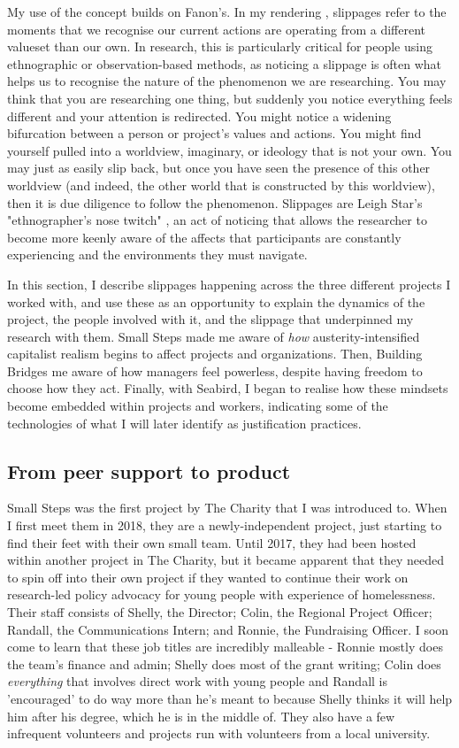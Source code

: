 My use of the concept builds on Fanon's. In my rendering \citep{cutting_making_2021}, slippages refer to the moments that we recognise our current actions are operating from a different valueset than our own. In research, this is particularly critical for people using ethnographic or observation-based methods, as noticing a slippage is often what helps us to recognise the nature of the phenomenon we are researching. You may think that you are researching one thing, but suddenly you notice everything feels different and your attention is redirected. You might notice a widening bifurcation between a person or project's values and actions. You might find yourself pulled into a worldview, imaginary, or ideology that is not your own. You may just as easily slip back, but once you have seen the presence of this other worldview (and indeed, the other world that is constructed by this worldview), then it is due diligence to follow the phenomenon. Slippages are Leigh Star's "ethnographer's nose twitch" \citep{leigh_star_this_2010}, an act of noticing that allows the researcher to become more keenly aware of the affects that participants are constantly experiencing and the environments they must navigate. 

In this section, I describe slippages happening across the three different projects I worked with, and use these as an opportunity to explain the dynamics of the project, the people involved with it, and the slippage that underpinned my research with them. Small Steps made me aware of \textit{how} austerity-intensified capitalist realism begins to affect projects and organizations. Then,  Building Bridges me aware of how managers feel powerless, despite having freedom to choose how they act. Finally, with Seabird, I began to realise how these mindsets become embedded within projects and workers, indicating some of the technologies of what I will later identify as justification practices. 

\subsection{From peer support to product}
Small Steps was the first project by The Charity that I was introduced to. When I first meet them in 2018, they are a newly-independent project, just starting to find their feet with their own small team. Until 2017, they had been hosted within another project in The Charity, but it became apparent that they needed to spin off into their own project if they wanted to continue their work on research-led policy advocacy for young people with experience of homelessness. Their staff consists of Shelly, the Director; Colin, the Regional Project Officer; Randall, the Communications Intern; and Ronnie, the Fundraising Officer. I soon come to learn that these job titles are incredibly malleable - Ronnie mostly does the team's finance and admin; Shelly does most of the grant writing; Colin does \textit{everything} that involves direct work with young people and Randall is 'encouraged' to do way more than he's meant to because Shelly thinks it will help him after his degree, which he is in the middle of. They also have a few infrequent volunteers and projects run with volunteers from a local university. 

